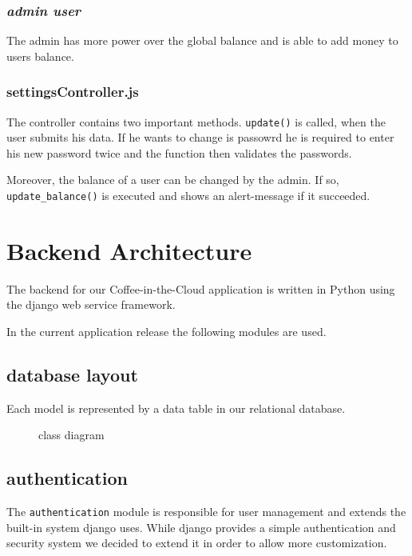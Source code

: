 \subsubsection*{\emph{admin user}}

The admin has more power over the global balance and is able to add
money to users balance.

\subsubsection*{settingsController.js}

The controller contains two important methods. \texttt{update()} is
called, when the user submits his data. If he wants to change is
passowrd he is required to enter his new password twice and the function
then validates the passwords.

Moreover, the balance of a user can be changed by the admin. If so,
\texttt{update\_balance()} is executed and shows an alert-message if it
succeeded.

\newpage
\section{Backend Architecture}\label{backend-architecture}

The backend for our Coffee-in-the-Cloud application is written in Python
using the django web service framework.

In the current application release the following modules are used.

\subsection{database layout}\label{database-layout}

Each model is represented by a data table in our relational database.

\begin{figure}[htbp]
\centering
{}
\caption{class diagram}
\end{figure}

\subsection{authentication}\label{authentication}

The \texttt{authentication} module is responsible for user management
and extends the built-in system django uses. While django provides a
simple authentication and security system we decided to extend it in
order to allow more customization.

